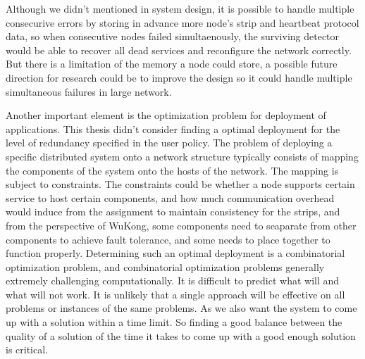 Although we didn't mentioned in system design, it is possible to handle multiple
consecurive errors by storing in advance more node's strip and heartbeat
protocol data, so when consecutive nodes failed simultaenously, the surviving
detector would be able to recover all dead services and reconfigure the network
correctly.  But there is a limitation of the memory a node could store,
a possible future direction for research could be to improve the design so it
could handle multiple simultaneous failures in large network.


\begin{comment}
Niels suggested that I show that I am aware of such issue with determining
optimality for deployment which is not clear for WuKong yet, there are many
ways or metrics to optimize for, all I can do in this work is to identify some
tradeoffs certain deployment for fault tolerance could influence the system
with certain metrics.

Limits will be hard to define here
Niels:about the tradeoffs in determining the deployment from your fault
tolerance perspective
Penn:Remember what the prof told me, about policy, first fit, last fit, etc
\end{comment}

Another important element is the optimization problem for deployment of
applications. This thesis didn't consider finding a optimal deployment for the
level of redundancy specified in the user policy. The problem of deploying
a specific distributed system onto a network structure typically consists of
mapping the components of the system onto the hosts of the network. The mapping
is subject to constraints. The constraints could be whether a node supports
certain service to host certain components, and how much communication overhead
would induce from the assignment to maintain consistency for the strips, and
from the perspective of WuKong, some components need to seaparate from other
components to achieve fault tolerance, and some needs to place together to
function properly.  Determining such an optimal deployment is a combinatorial
optimization problem, and combinatorial optimization problems generally
extremely challenging computationally. It is difficult to predict what will and
what will not work.  It is unlikely that a single approach will be effective on
all problems or instances of the same problems. As we also want the system to
come up with a solution within a time limit. So finding a good balance between
the quality of a solution of the time it takes to come up with a good enough
solution is critical.
